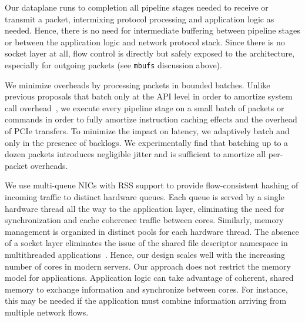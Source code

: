 

 Our dataplane 
runs to completion all pipeline stages needed to receive or transmit a
packet, intermixing protocol processing and application logic as
needed. Hence, there is no need for intermediate buffering between
pipeline stages or between the application logic and network protocol
stack. Since there is no socket layer at all, flow control is directly
but safely exposed to the architecture, especially for outgoing
packets (see \texttt{mbufs} discussion  above).

We minimize overheads by processing packets in bounded batches.
Unlike previous proposals that batch only at the API level in order to
amortize system call overhead~\cite{jeong2014mtcp,han2012megapipe}, we
execute every pipeline stage on a small batch of packets or commands
in order to fully amortize instruction caching effects and the
overhead of PCIe transfers. To minimize the impact on latency, we
adaptively batch and only in the presence of backlogs. We
experimentally find that batching up to a dozen 
packets introduces negligible jitter and is sufficient to amortize all
per-packet overheads.


 We use multi-queue
NICs with RSS support to provide flow-consistent hashing of incoming
traffic to distinct hardware queues. Each queue is served by a single
hardware thread all the way to the application layer, eliminating the
need for synchronization and cache coherence traffic between
cores. Similarly, memory management is organized in distinct pools for
each hardware thread. The absence of a socket layer eliminates the
issue of the shared file descriptor namespace in multithreaded applications~\cite{DBLP:conf/sosp/ClementsKZMK13}. Hence,
our design scales well with the increasing number of cores in modern
servers. Our approach does not restrict the memory model for
applications. Application logic can take advantage of coherent, shared
memory to exchange information and synchronize between cores. For
instance, this may be needed if the application must combine
information arriving from multiple network flows.



